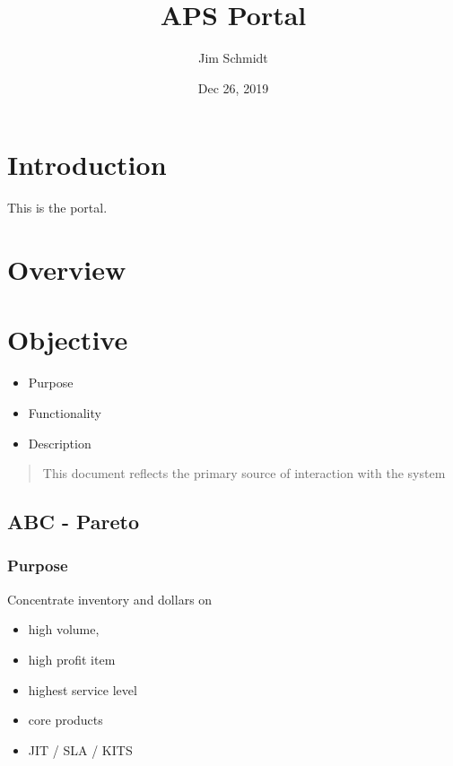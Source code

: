 \documentclass[letterpaper,10pt,english]{sphinxmanual}
\title{APS Portal}
\date{Dec 26, 2019}
\author{Jim Schmidt}
\begin{document}
\pagestyle{empty}
\sphinxmaketitle
\pagestyle{plain}
\sphinxtableofcontents
\pagestyle{normal}
\label{\detokenize{index::doc}}



\chapter{Introduction}
\label{\detokenize{index:introduction}}
This is the portal.


\chapter{Overview}
\label{\detokenize{index:overview}}

\chapter{Objective}
\label{\detokenize{index:objective}}\begin{itemize}
\item {} 
Purpose

\item {} 
Functionality

\item {} 
Description

\end{itemize}
\begin{quote}

This document reflects the primary source of interaction with the system
\end{quote}


\section{ABC - Pareto}
\label{\detokenize{100-ABC:abc-pareto}}\label{\detokenize{100-ABC::doc}}

\subsection{Purpose}
\label{\detokenize{100-ABC:purpose}}
Concentrate inventory and dollars on
\begin{itemize}
\item {} 
high volume,

\item {} 
high profit item

\item {} 
highest service level

\item {} 
core products

\item {} 
JIT / SLA / KITS

\end{itemize}
\end{document}
